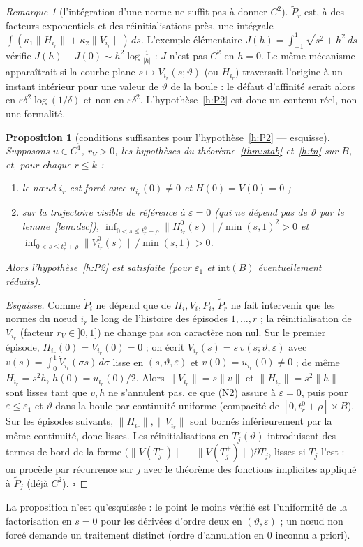 \documentclass[11pt,a4paper]{article}
\newtheorem{proposition}[theoreme]{Proposition}
\theoremstyle{remark}
\newtheorem{remarque}[theoreme]{Remarque}
\theoremstyle{definition}
\newcommand{\norm}[1]{\lVert #1\rVert}
\newcommand{\eps}{\varepsilon}
\newcommand{\vth}{\vartheta}
\newcommand{\Pt}{\widetilde P}
\begin{document}
\begin{remarque}[l'intégration d'une norme ne suffit pas à donner $C^2$]
$\Pt_r$ est, à des facteurs exponentiels et des réinitialisations près, une intégrale $\int(\kappa_1\norm{H_{i_r}}+\kappa_2\norm{V_{i_r}})\,ds$. L'exemple élémentaire $J(h)=\int_{-1}^1\sqrt{s^2+h^2}\,ds$ vérifie $J(h)-J(0)\sim h^2\log\frac1{|h|}$ : $J$ n'est pas $C^2$ en $h=0$. Le même mécanisme apparaîtrait si la courbe plane $s\mapsto V_{i_r}(s;\vth)$ (ou $H_{i_r}$) traversait l'origine à un instant intérieur pour une valeur de $\vth$ de la boule : le défaut d'affinité serait alors en $\eps\delta^2\log(1/\delta)$ et non en $\eps\delta^2$. L'hypothèse~\ref{h:P2} est donc un contenu réel, non une formalité.
\end{remarque}

\begin{proposition}[conditions suffisantes pour l'hypothèse~\ref{h:P2} --- esquisse]\label{prop:suff}
Supposons $u\in C^1$, $r_V>0$, les hypothèses du théorème~\ref{thm:stab} et~\ref{h:tn} sur $B$, et, pour chaque $r\le k$ :
\begin{enumerate}[label=(N\arabic*)]
\item le n\oe ud $i_r$ est forcé avec $u_{i_r}(0)\ne0$ et $H(0)=V(0)=0$ ;
\item sur la trajectoire \emph{visible de référence} à $\eps=0$ (qui ne dépend pas de $\vth$ par le lemme~\ref{lem:dec}), $\inf_{0<s\le t_r^0+\rho}\norm{H^0_{i_r}(s)}/\min(s,1)^2>0$ et $\inf_{0<s\le t_r^0+\rho}\norm{V^0_{i_r}(s)}/\min(s,1)>0$.
\end{enumerate}
Alors l'hypothèse~\ref{h:P2} est satisfaite (pour $\eps_1$ et $\mathrm{int}(B)$ éventuellement réduits).
\end{proposition}
\begin{proof}[Esquisse]
Comme $\dot P_{i}$ ne dépend que de $H_i,V_i,P_i$, $\Pt_r$ ne fait intervenir que les normes du n\oe ud $i_r$ le long de l'histoire des épisodes $1,\dots,r$ ; la réinitialisation de $V_{i_r}$ (facteur $r_V\in]0,1]$) ne change pas son caractère non nul. Sur le premier épisode, $H_{i_r}(0)=V_{i_r}(0)=0$ ; on écrit $V_{i_r}(s)=s\,v(s;\vth,\eps)$ avec $v(s)=\int_0^1\dot V_{i_r}(\sigma s)\,d\sigma$ lisse en $(s,\vth,\eps)$ et $v(0)=u_{i_r}(0)\ne0$ ; de même $H_{i_r}=s^2h$, $h(0)=u_{i_r}(0)/2$. Alors $\norm{V_{i_r}}=s\norm v$ et $\norm{H_{i_r}}=s^2\norm h$ sont lisses tant que $v,h$ ne s'annulent pas, ce que (N2) assure à $\eps=0$, puis pour $\eps\le\eps_1$ et $\vth$ dans la boule par continuité uniforme (compacité de $[0,t_r^0+\rho]\times B$). Sur les épisodes suivants, $\norm{H_{i_r}},\norm{V_{i_r}}$ sont bornés inférieurement par la même continuité, donc lisses. Les réinitialisations en $T_j^\eps(\vth)$ introduisent des termes de bord de la forme $\bigl(\norm{V(T_j^-)}-\norm{V(T_j^+)}\bigr)\partial T_j$, lisses si $T_j$ l'est : on procède par récurrence sur $j$ avec le théorème des fonctions implicites appliqué à $\Pt_j$ (déjà $C^2$). $\square$
\end{proof}
La proposition n'est qu'esquissée : le point le moins vérifié est l'uniformité de la factorisation en $s=0$ pour les dérivées d'ordre deux en $(\vth,\eps)$ ; un nœud non forcé demande un traitement distinct (ordre d'annulation en $0$ inconnu a priori).
\end{document}
